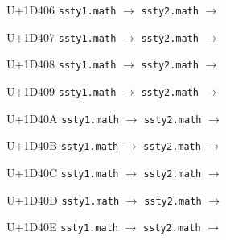 \documentclass{article}
\begin{document}
\begin{substitutions}
\goodbreak

U+1D406  \linebreak
    \texttt{ssty1.math} $\to$  \linebreak
    \texttt{ssty2.math} $\to$  

\goodbreak

U+1D407  \linebreak
    \texttt{ssty1.math} $\to$  \linebreak
    \texttt{ssty2.math} $\to$  

\goodbreak

U+1D408  \linebreak
    \texttt{ssty1.math} $\to$  \linebreak
    \texttt{ssty2.math} $\to$  

\goodbreak

U+1D409  \linebreak
    \texttt{ssty1.math} $\to$  \linebreak
    \texttt{ssty2.math} $\to$  

\goodbreak

U+1D40A  \linebreak
    \texttt{ssty1.math} $\to$  \linebreak
    \texttt{ssty2.math} $\to$  

\goodbreak

U+1D40B  \linebreak
    \texttt{ssty1.math} $\to$  \linebreak
    \texttt{ssty2.math} $\to$  

\goodbreak

U+1D40C  \linebreak
    \texttt{ssty1.math} $\to$  \linebreak
    \texttt{ssty2.math} $\to$  

\goodbreak

U+1D40D  \linebreak
    \texttt{ssty1.math} $\to$  \linebreak
    \texttt{ssty2.math} $\to$  

\goodbreak

U+1D40E  \linebreak
    \texttt{ssty1.math} $\to$  \linebreak
    \texttt{ssty2.math} $\to$  


\end{substitutions}
\end{document}
